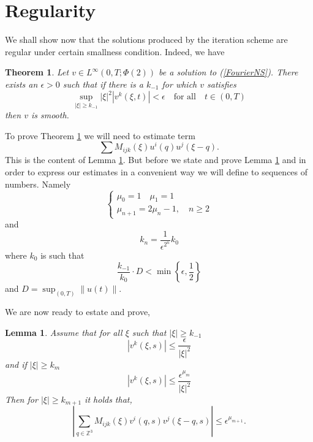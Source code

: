 \documentclass{amsart}
\newtheorem{theorem}{Theorem}
\newtheorem{lemma}{Lemma}
\begin{document}
\section{Regularity}


We shall show now that the solutions produced by the iteration scheme are regular under
certain smallness condition. Indeed, we have
\begin{theorem}
\label{regularity}
Let $v\in L^{\infty}\left(0,T;\Phi\left(2\right)\right)$ be a solution to (\ref{FourierNS}). There
exists an $\epsilon>0$ such that if there is a $k_{-1}$ for which $v$ satisfies
\begin{equation}
\sup_{\left|\xi\right|\geq k_{-1}}\left|\xi\right|^2\left|v^k\left(\xi,t\right)\right|<\epsilon
\quad\mbox{for all} \quad t\in\left(0,T\right)
\end{equation}
then $v$ is smooth.
\end{theorem}


To prove Theorem \ref{regularity} we will need to estimate term
\[
\sum M_{ijk}\left(\xi\right)u^i\left(q\right)u^j\left(\xi-q\right).
\]
This is the content of Lemma \ref{regularity1}. 
But before we state and prove Lemma \ref{regularity1} and in order to express
our estimates in a convenient way we will define to sequences of numbers.
Namely
\[
\left\{
\begin{array}{l}
\mu_0=1\quad \mu_1=1\\
\mu_{n+1}=2\mu_n-1,\quad n\geq 2 
\end{array}
\right.
\]
and 
\[
k_n=\frac{1}{\epsilon^{2^n}}k_0
\]
where $k_0$ is such that 
\[
\frac{k_{-1}}{k_0}\cdot D < \min \left\{\epsilon, \frac{1}{2}\right\}
\]
and $D= \sup_{\left(0,T\right)}\left\|u\left(t\right)\right\|$.

We are now ready to estate and prove,
\begin{lemma}
\label{regularity1}
Assume  that for all $\xi$ such that $\left|\xi\right|\geq k_{-1}$ 
\[
\left|v^k\left(\xi,s\right)\right|\leq \frac{\epsilon}{\left|\xi\right|^2}
\]
and if $\left|\xi\right|\geq k_m$
\[
\left|v^k\left(\xi,s\right)\right|\leq \frac{\epsilon^{\mu_m}}{\left|\xi\right|^2}
\]
Then for $\left|\xi\right|\geq k_{m+1}$ it holds that,
\[
\left|\sum_{q\in\mathbb{Z}^3}M_{ijk}\left(\xi\right)v^i\left(q,s\right)v^j\left(\xi-q,s\right)\right|
\leq \epsilon^{\mu_{m+1}}.
\]
\end{lemma}
\end{document}
